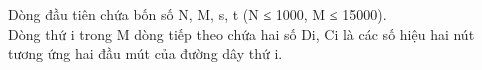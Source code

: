 Dòng đầu tiên chứa bốn số N, M, s, t (N ≤ 1000, M ≤ 15000).
\\Dòng thứ i trong M dòng tiếp theo chứa hai số Di, Ci là các số hiệu hai nút tương ứng hai đầu mút của đường dây thứ i.

\